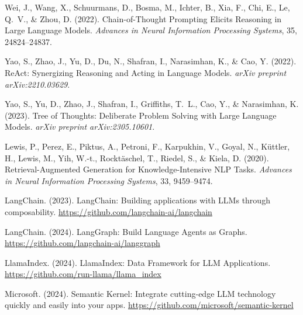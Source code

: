 
Wei, J., Wang, X., Schuurmans, D., Bosma, M., Ichter, B., Xia, F., Chi, E., Le, Q.~V., \& Zhou, D. (2022). Chain-of-Thought Prompting Elicits Reasoning in Large Language Models. \textit{Advances in Neural Information Processing Systems}, 35, 24824--24837.

Yao, S., Zhao, J., Yu, D., Du, N., Shafran, I., Narasimhan, K., \& Cao, Y. (2022). ReAct: Synergizing Reasoning and Acting in Language Models. \textit{arXiv preprint arXiv:2210.03629}.

Yao, S., Yu, D., Zhao, J., Shafran, I., Griffiths, T.~L., Cao, Y., \& Narasimhan, K. (2023). Tree of Thoughts: Deliberate Problem Solving with Large Language Models. \textit{arXiv preprint arXiv:2305.10601}.


Lewis, P., Perez, E., Piktus, A., Petroni, F., Karpukhin, V., Goyal, N., K{\"u}ttler, H., Lewis, M., Yih, W.-t., Rockt{\"a}schel, T., Riedel, S., \& Kiela, D. (2020). Retrieval-Augmented Generation for Knowledge-Intensive NLP Tasks. \textit{Advances in Neural Information Processing Systems}, 33, 9459--9474.


LangChain. (2023). LangChain: Building applications with LLMs through composability. \url{https://github.com/langchain-ai/langchain}

LangChain. (2024). LangGraph: Build Language Agents as Graphs. \url{https://github.com/langchain-ai/langgraph}

LlamaIndex. (2024). LlamaIndex: Data Framework for LLM Applications. \url{https://github.com/run-llama/llama_index}

Microsoft. (2024). Semantic Kernel: Integrate cutting-edge LLM technology quickly and easily into your apps. \url{https://github.com/microsoft/semantic-kernel}


